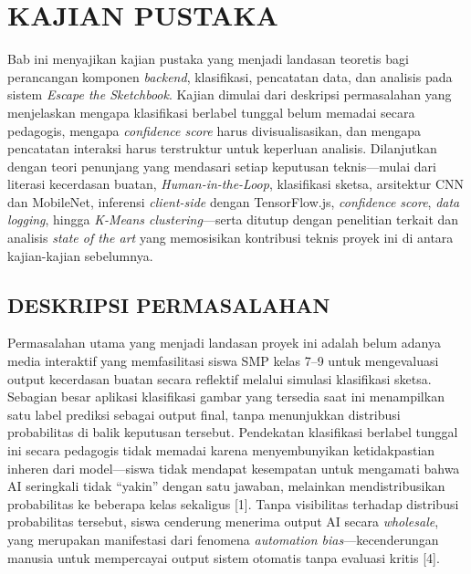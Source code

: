 
\chapter{KAJIAN PUSTAKA}
\label{chap:bab2}

Bab ini menyajikan kajian pustaka yang menjadi landasan teoretis bagi perancangan komponen \textit{backend}, klasifikasi, pencatatan data, dan analisis pada sistem \textit{Escape the Sketchbook}. Kajian dimulai dari deskripsi permasalahan yang menjelaskan mengapa klasifikasi berlabel tunggal belum memadai secara pedagogis, mengapa \textit{confidence score} harus divisualisasikan, dan mengapa pencatatan interaksi harus terstruktur untuk keperluan analisis. Dilanjutkan dengan teori penunjang yang mendasari setiap keputusan teknis—mulai dari literasi kecerdasan buatan, \textit{Human-in-the-Loop}, klasifikasi sketsa, arsitektur CNN dan MobileNet, inferensi \textit{client-side} dengan TensorFlow.js, \textit{confidence score}, \textit{data logging}, hingga \textit{K-Means clustering}—serta ditutup dengan penelitian terkait dan analisis \textit{state of the art} yang memosisikan kontribusi teknis proyek ini di antara kajian-kajian sebelumnya.

\section{DESKRIPSI PERMASALAHAN}
\label{sec:deskripsi-permasalahan}

Permasalahan utama yang menjadi landasan proyek ini adalah belum adanya media interaktif yang memfasilitasi siswa SMP kelas 7--9 untuk mengevaluasi output kecerdasan buatan secara reflektif melalui simulasi klasifikasi sketsa. Sebagian besar aplikasi klasifikasi gambar yang tersedia saat ini menampilkan satu label prediksi sebagai output final, tanpa menunjukkan distribusi probabilitas di balik keputusan tersebut. Pendekatan klasifikasi berlabel tunggal ini secara pedagogis tidak memadai karena menyembunyikan ketidakpastian inheren dari model—siswa tidak mendapat kesempatan untuk mengamati bahwa AI seringkali tidak ``yakin'' dengan satu jawaban, melainkan mendistribusikan probabilitas ke beberapa kelas sekaligus [1]. Tanpa visibilitas terhadap distribusi probabilitas tersebut, siswa cenderung menerima output AI secara \textit{wholesale}, yang merupakan manifestasi dari fenomena \textit{automation bias}—kecenderungan manusia untuk mempercayai output sistem otomatis tanpa evaluasi kritis [4].

